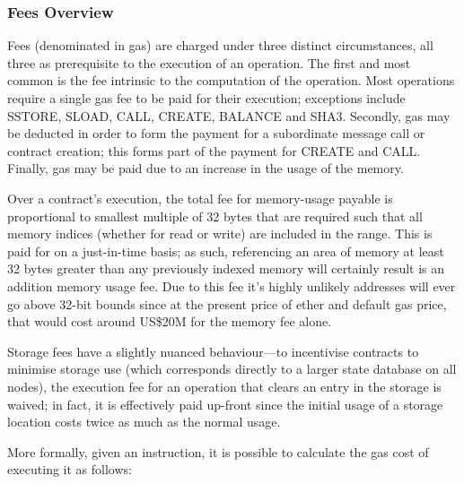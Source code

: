 \documentclass[9pt,oneside]{amsart}
\begin{document}
\begin{multicols}{2}
\subsubsection{Fees Overview}

Fees (denominated in gas) are charged under three distinct circumstances, all three as prerequisite to the execution of an operation. The first and most common is the fee intrinsic to the computation of the operation. Most operations require a single gas fee to be paid for their execution; exceptions include {\small SSTORE}, {\small SLOAD}, {\small CALL}, {\small CREATE}, {\small BALANCE} and {\small SHA3}. Secondly, gas may be deducted in order to form the payment for a subordinate message call or contract creation; this forms part of the payment for {\small CREATE} and {\small CALL}. Finally, gas may be paid due to an increase in the usage of the memory.

Over a contract's execution, the total fee for memory-usage payable is proportional to smallest multiple of 32 bytes that are required such that all memory indices (whether for read or write) are included in the range. This is paid for on a just-in-time basis; as such, referencing an area of memory at least 32 bytes greater than any previously indexed memory will certainly result is an addition memory usage fee. Due to this fee it's highly unlikely addresses will ever go above 32-bit bounds since at the present price of ether and default gas price, that would cost around US\$20M for the memory fee alone.

Storage fees have a slightly nuanced behaviour---to incentivise contracts to minimise storage use (which corresponds directly to a larger state database on all nodes), the execution fee for an operation that clears an entry in the storage is waived; in fact, it is effectively paid up-front since the initial usage of a storage location costs twice as much as the normal usage.

More formally, given an instruction, it is possible to calculate the gas cost of executing it as follows:


\end{multicols}
\end{document}
